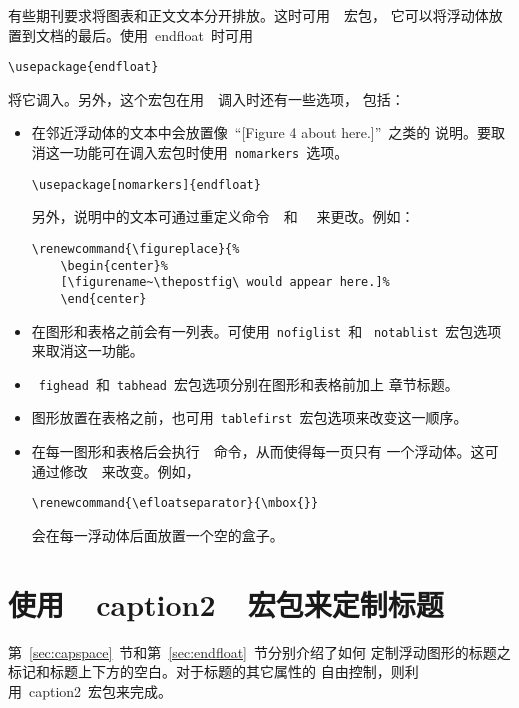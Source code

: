 有些期刊要求将图表和正文文本分开排放。这时可用~~宏包，
它可以将浮动体放置到文档的最后。使用~\textsf{endfloat}~时可用
\begin{Verbatim}[xleftmargin=1cm]
\usepackage{endfloat}
\end{Verbatim}
将它调入。另外，这个宏包在用~~调入时还有一些选项，
包括：
\begin{itemize}
	\item 在邻近浮动体的文本中会放置像~``[Figure 4 about here.]''~之类的
	说明。要取消这一功能可在调入宏包时使用~\texttt{nomarkers}~选项。
	\begin{Verbatim}[xleftmargin=1cm]
	\usepackage[nomarkers]{endfloat}
	\end{Verbatim}
	另外，说明中的文本可通过重定义命令~~和~~
	来更改。例如：
	\begin{Verbatim}[xleftmargin=1cm]
	\renewcommand{\figureplace}{% 
	\begin{center}% 
	[\figurename~\thepostfig\ would appear here.]% 
	\end{center}
	\end{Verbatim}
	\item 在图形和表格之前会有一列表。可使用~\texttt{nofiglist}~和
	~\texttt{notablist}~宏包选项来取消这一功能。
	\item ~\texttt{fighead}~和~\texttt{tabhead}~宏包选项分别在图形和表格前加上
	章节标题。
	\item 图形放置在表格之前，也可用~\texttt{tablefirst}~宏包选项来改变这一顺序。
	\item 在每一图形和表格后会执行~~命令，从而使得每一页只有
	一个浮动体。这可通过修改~~来改变。例如，
	\begin{Verbatim}[xleftmargin=1cm]
	\renewcommand{\efloatseparator}{\mbox{}}
	\end{Verbatim}
	会在每一浮动体后面放置一个空的盒子。
\end{itemize}

\section{使用~~caption2~~宏包来定制标题}\label{sec:caption2}

第~\ref{sec:capspace}~节和第~\ref{sec:endfloat}~节分别介绍了如何
定制浮动图形的标题之标记和标题上下方的空白。对于标题的其它属性的
自由控制，则利用~\textsf{caption2}~宏包来完成。

